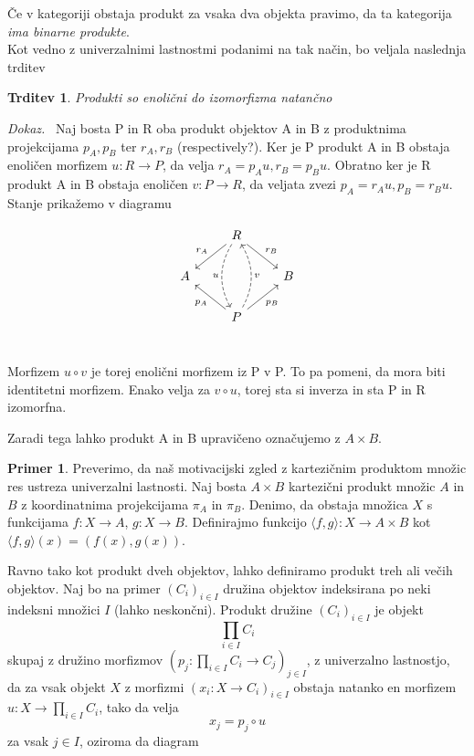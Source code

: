 \documentclass[12pt,a4paper]{book}
\theoremstyle{definition}
\theoremstyle{plain}
\newtheorem{trditev}[definicija]{Trditev}
\newenvironment{dokaz}{\emph{Dokaz.}\ }{\hspace{\fill}{$\Box$}}
\theoremstyle{definition}
\newtheorem{primer}{Primer}[section]
\theoremstyle{remark}
\begin{document}
Če v kategoriji obstaja produkt za vsaka dva objekta pravimo, da ta kategorija \textit{ima binarne produkte}. \\
Kot vedno z univerzalnimi lastnostmi podanimi na tak način, bo veljala naslednja trditev

\begin{trditev}
Produkti so enolični do izomorfizma natančno
\end{trditev}
\begin{dokaz}
Naj bosta P in R oba produkt objektov A in B z produktnima projekcijama $p_A, p_B$ ter $r_A, r_B$ (respectively?). Ker je P produkt A in B obstaja enoličen morfizem $u : R \to P$, da velja $r_A = p_Au, r_B = p_Bu$. Obratno ker je R produkt A in B obstaja enoličen $v : P \to R$, da veljata zvezi $p_A = r_Au, p_B = r_Bu$. Stanje prikažemo v diagramu

$$\begin{tikzcd}
& R \ar[dd, dashed, bend right, "u"'] \ar[dl, "r_A"'] \ar[dr, "r_B"] & \\
A & & B \\
& P \ar[uu, dashed, bend right, "v"'] \ar[ul, "p_A"] \ar[ur, "p_B"'] & \\
\end{tikzcd}$$

Morfizem $u \circ v $ je torej enolični morfizem iz P v P. To pa pomeni, da mora biti identitetni morfizem. Enako velja za $v \circ u$, torej sta si inverza in sta P in R izomorfna.
\end{dokaz}

Zaradi tega lahko produkt A in B upravičeno označujemo z $A \times B$.

\begin{primer}
Preverimo, da naš motivacijski zgled z kartezičnim produktom množic res ustreza univerzalni lastnosti. Naj bosta $A \times B$ kartezični produkt množic $A$ in $B$ z koordinatnima projekcijama $\pi_A$ in $\pi_B$. Denimo, da obstaja množica $X$ s funkcijama $f : X \to A$, $g : X \to B$. Definirajmo funkcijo $\langle f,g \rangle : X \to A \times B$ kot $\langle f,g \rangle(x) = (f(x),g(x))$.
\end{primer}

Ravno tako kot produkt dveh objektov, lahko definiramo produkt treh ali večih objektov. Naj bo na primer $(C_i)_{i \in I}$ družina objektov indeksirana po neki indeksni množici $I$ (lahko neskončni). Produkt družine $(C_i)_{i \in I}$ je objekt
$$\prod_{i \in I}C_i$$
skupaj z družino morfizmov $(p_j : \prod_{i \in I}C_i \to C_j)_{j \in I}$, z univerzalno lastnostjo, da za vsak objekt $X$ z morfizmi $(x_i : X \to C_i)_{i \in I}$ obstaja natanko en morfizem $u : X \to \prod_{i \in I}C_i$, tako da velja $$x_j = p_j \circ u$$ za vsak $j \in I$, oziroma da diagram
\end{document}
